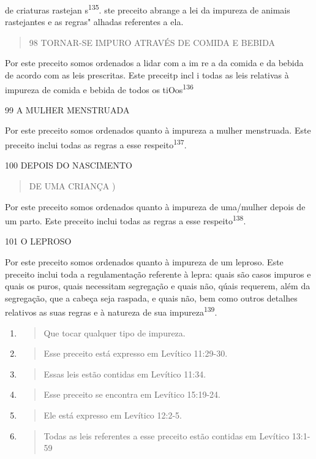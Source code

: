 de criaturas rastejan s\textsuperscript{135}. ste preceito abrange a lei
da impureza de animais rastejantes e as regras" alhadas referentes a
ela.

\begin{quote}
98 TORNAR-SE IMPURO ATRAVÉS DE COMIDA E BEBIDA
\end{quote}

Por este preceito somos ordenados a lidar com a im re a da comi­da e da
bebida de acordo com as leis prescritas. Este preceitp incl i todas as
leis relativas à impureza de comida e bebida de todos os
tiOos\textsuperscript{136}

99 A MULHER MENSTRUADA

Por este preceito somos ordenados quanto à impureza a mulher menstruada.
Este preceito inclui todas as regras a esse
respeito\textsuperscript{137}.

100 DEPOIS DO NASCIMENTO

\begin{quote}
DE UMA CRIANÇA )
\end{quote}

Por este preceito somos ordenados quanto à impureza de uma/mu­lher
depois de um parto. Este preceito inclui todas as regras a esse
respeito\textsuperscript{138}.

101 O LEPROSO

Por este preceito somos ordenados quanto à impureza de um lepro­so. Este
preceito inclui toda a regulamentação referente à lepra: quais são casos
impuros e quais os puros, quais necessitam segregação e quais não, qúais
requerem, além da segregação, que a cabeça seja raspada, e quais não,
bem co­mo outros detalhes relativos as suas regras e à natureza de sua
impureza\textsuperscript{139}.

\begin{enumerate}
\def\labelenumi{\arabic{enumi}.}
\setcounter{enumi}{133}
\item
  \begin{quote}
  Que tocar qualquer tipo de impureza.
  \end{quote}
\item
  \begin{quote}
  Esse preceito está expresso em Levítico 11:29-30.
  \end{quote}
\item
  \begin{quote}
  Essas leis estão contidas em Levítico 11:34.
  \end{quote}
\item
  \begin{quote}
  Esse preceito se encontra em Levítico 15:19-24.
  \end{quote}
\item
  \begin{quote}
  Ele está expresso em Levítico 12:2-5.
  \end{quote}
\item
  \begin{quote}
  Todas as leis referentes a esse preceito estão contidas em Levítico
  13:1-59
  \end{quote}
\end{enumerate}

